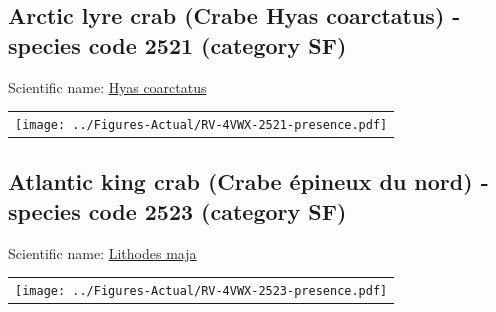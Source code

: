 \documentclass[12pt]{article}\usepackage[]{graphicx}\usepackage[]{color}
\begin{document}
\setcounter{figure}{0}

\hypertarget{sec:2521}{%
\subsection{Arctic lyre crab (Crabe Hyas coarctatus) - species code 2521 (category SF)}\label{sec:2521}}

  


Scientific name: \href{http://www.marinespecies.org/aphia.php?p=taxdetails\&id=107323}{Hyas coarctatus} \newline
\begin{minipage}{1.0\textwidth}
 \begin{tabular}{c}
\texttt{[image: ../Figures-Actual/RV-4VWX-2521-presence.pdf]} \\ 
\end{tabular} 
\end{minipage}
\clearpage

\renewcommand\thefigure{\thesubsection\Alph{figure}}

\setcounter{figure}{0}

\hypertarget{sec:2523}{%
\subsection{Atlantic king crab (Crabe épineux du nord) - species code 2523 (category SF)}\label{sec:2523}}

  


Scientific name: \href{http://www.marinespecies.org/aphia.php?p=taxdetails\&id=107205}{Lithodes maja} \newline
\begin{minipage}{1.0\textwidth}
 \begin{tabular}{c}
\texttt{[image: ../Figures-Actual/RV-4VWX-2523-presence.pdf]} \\ 
\end{tabular} 
\end{minipage}
\clearpage

\renewcommand\thefigure{\thesubsection\Alph{figure}}

\setcounter{figure}{0}
\end{document}

